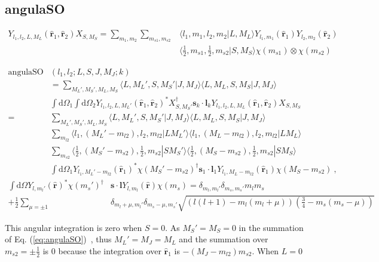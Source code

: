 \documentclass{article}
\renewcommand{\d}{\mathrm{d}}
\begin{document}
\subsection{angulaSO}\label{app:angulaSO}
\begin{align}
Y_{l_1,l_2,L,M_L}(\bm{\hat r}_1,\bm{\hat r}_2)X_{S,M_S} = \sum_{m_1,m_2}\sum_{m_{s1},m_{s2}}&\langle l_1,m_1,l_2,m_2|L,M_L\rangle Y_{l_1,m_1}(\bm{\hat r}_1)Y_{l_2,m_2}(\bm{\hat r}_2)\nonumber \\
&  \langle \frac 12,m_{s1},\frac 12,m_{s2}|S,M_S\rangle \chi(m_{s1})\otimes\chi(m_{s2}) %
\end{align}

\begin{align}
\text{angulaSO}&(l_1,l_2;L,S,J,M_J;k) \nonumber\\
&= \sum_{M_L',M_S',M_L,M_S}\langle L,M_L',S,M_S'|J,M_J\rangle\langle L,M_L,S,M_S|J,M_J\rangle\nonumber\\
&\int\d\Omega_1\int\d\Omega_2 Y_{l_1,l_2,L,M_L'}(\bm{\hat r}_1,\bm{\hat r}_2)^*X_{S,M_S'}^\dagger\bm{s}_k\cdot\bm{l}_kY_{l_1,l_2,L,M_L}(\bm{\hat r}_1,\bm{\hat r}_2)X_{S,M_S}\label{eq:angulaSO}\\
=& \sum_{M_L',M_S',M_L,M_S}\langle L,M_L',S,M_S'|J,M_J\rangle\langle L,M_L,S,M_S|J,M_J\rangle\nonumber\\
& \sum_{m_{l2}} \langle l_1,(M_L'-m_{l2}),l_2,m_{l2} | L M_L'\rangle \langle l_1,(M_L-m_{l2}),l_2,m_{l2} | L M_L\rangle\nonumber\\
& \sum_{m_{s2}} \langle \frac 12,(M_S'-m_{s2}),\frac 12,m_{s2} | S M_S'\rangle \langle \frac 12,(M_S-m_{s2}),\frac 12,m_{s2} | S M_S\rangle\nonumber\\
&\int \d\Omega_1Y_{l_1,M_L'-m_{l2}}(\bm{\hat r}_1)^*\chi(M_S'-m_{s2})^\dagger \bm{s}_1\cdot \bm{l}_1 Y_{l_1,M_L-m_{l2}}(\bm{\hat r}_1)\chi(M_S-m_{s2})~,
\end{align}
\begin{align}
\int \d\Omega Y_{l,m_l'}(\bm{\hat r})^*\chi(m_s')^\dagger &\bm{s}\cdot \bm{l} Y_{l,m_l}(\bm{\hat r})\chi(m_s) = \delta_{m_{l},m_{l}'}\delta_{m_{s},m_{s}'} m_{l}m_{s} \nonumber\\
+\frac 12 \sum_{\mu=\pm 1}&\delta_{{m_{l}+\mu,m_{l}'}}\delta_{m_{s}-\mu,m_{s}'}\sqrt{\left(l(l+1)-m_{l}(m_{l}+\mu)\right)\left(\frac 34 - m_{s}(m_{s}-\mu)\right)}
\end{align}

This angular integration is zero when $S=0$. As $M_S'=M_S=0$ in the summation of Eq. (\ref{eq:angulaSO})~, thus $M_L'=M_J = M_L$ and the summation over $m_{s2}=\pm\frac 12$ is $0$ because the integration over $\bm{\hat r}_1$ is $-(M_J-m_{l2})m_{s2}$. When $L=0$
\end{document}
